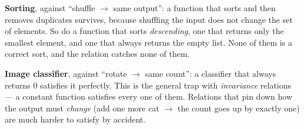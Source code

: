\documentclass[addpoints]{exam}
\begin{document}
\begin{questions}
\begin{parts}
\begin{solution}
    \textbf{Sorting}, against ``shuffle $\longrightarrow$ same
    output'': a function that sorts and then removes duplicates
    survives, because shuffling the input does not change the set of
    elements. So do a function that sorts \emph{descending}, one that
    returns only the smallest element, and one that always returns the
    empty list. None of them is a correct sort, and the relation
    catches none of them.

    \textbf{Image classifier}, against ``rotate $\longrightarrow$ same
    count'': a classifier that always returns 0 satisfies it
    perfectly. This is the general trap with \emph{invariance}
    relations --- a constant function satisfies every one of them.
    Relations that pin down how the output must \emph{change} (add one
    more cat $\longrightarrow$ the count goes up by exactly one) are
    much harder to satisfy by accident.
  \end{solution}

\end{parts}

\end{questions}
\end{document}

